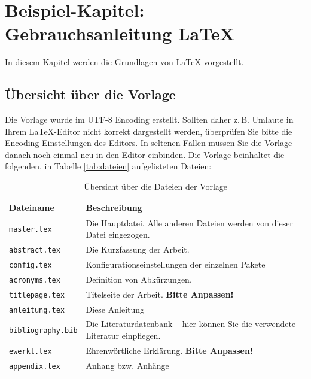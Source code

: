 \chapter{Beispiel-Kapitel: Gebrauchsanleitung \LaTeX}

\nocite{*}

In diesem Kapitel werden die Grundlagen von \LaTeX{} vorgestellt.

\section{Übersicht über die Vorlage}
Die Vorlage wurde im UTF-8 Encoding erstellt. Sollten daher z.\,B. Umlaute in Ihrem \LaTeX-Editor nicht korrekt dargestellt werden, überprüfen Sie bitte die Encoding-Ein\-stel\-lun\-gen des Editors. In seltenen Fällen müssen Sie die Vorlage danach noch einmal neu in den Editor einbinden. 
Die Vorlage beinhaltet die folgenden, in Tabelle \vref{tab:dateien} aufgelisteten Dateien: 
\begin{table}[h!]
	\centering
\begin{tabular}{lp{10cm}}
	\textbf{Dateiname} & \textbf{Beschreibung}\\\toprule
	\texttt{master.tex} & Die Hauptdatei. Alle anderen Dateien werden von dieser Datei eingezogen. \\
	\texttt{abstract.tex} & Die Kurzfassung der Arbeit. \\	
	\texttt{config.tex} & Konfigurationseinstellungen 	 der einzelnen Pakete\\
	\texttt{acronyms.tex} & Definition von Abkürzungen. \\
	\texttt{titlepage.tex} & Titelseite der Arbeit. \textbf{Bitte Anpassen!}\\
	\texttt{anleitung.tex} & Diese Anleitung\\ 
	\texttt{bibliography.bib}&  Die Literaturdatenbank -- hier können Sie die verwendete Literatur einpflegen.\\
	\texttt{ewerkl.tex} & Ehrenwörtliche Erklärung. \textbf{Bitte Anpassen!}\\
	\texttt{appendix.tex} & Anhang bzw. Anhänge \\\bottomrule
\end{tabular}
\caption{\label{tab:dateien}Übersicht über die Dateien der Vorlage}
\end{table}

